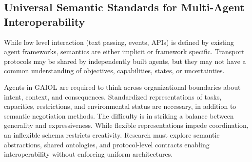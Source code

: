 \documentclass[final,5p,times,twocolumn,authoryear,draft]{elsarticle}
\begin{document}

\subsection{Universal Semantic Standards for Multi-Agent Interoperability}

While low level interaction (text passing, events, APIs) is defined by existing agent frameworks, semantics are either implicit or framework specific. Transport protocols may be shared by independently built agents, but they may not have a common understanding of objectives, capabilities, states, or uncertainties.

Agents in GAIOL are required to think across organizational boundaries about intent, context, and consequences. Standardized representations of tasks, capacities, restrictions, and environmental status are necessary, in addition to semantic negotiation methods. The difficulty is in striking a balance between generality and expressiveness. While flexible representations impede coordination, an inflexible schema restricts creativity. Research must explore semantic abstractions, shared ontologies, and protocol-level contracts enabling interoperability without enforcing uniform architectures.


\end{document}
